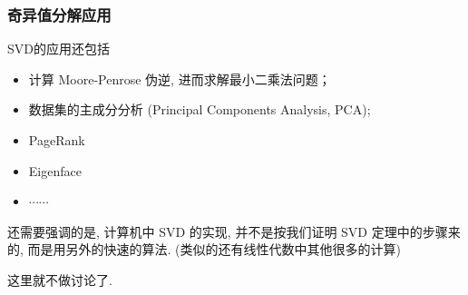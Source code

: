 
\begin{frame}
\frametitle{奇异值分解应用}

SVD的应用还包括
\begin{itemize}
\item 计算 Moore-Penrose 伪逆, 进而求解最小二乘法问题；
\item 数据集的主成分分析 (Principal Components Analysis, PCA);
\item PageRank
\item Eigenface
\item $\cdots\cdots$
\end{itemize}

\vspace{1em}
\pause

还需要强调的是, 计算机中 SVD 的实现, 并不是按我们证明 SVD 定理中的步骤来的, 而是用另外的快速的算法.  (类似的还有线性代数中其他很多的计算)

这里就不做讨论了.

\end{frame}



